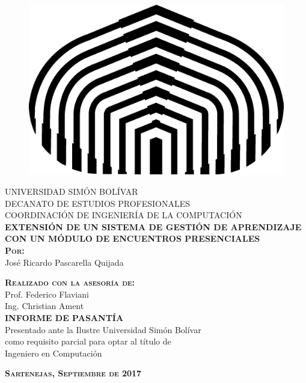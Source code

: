 \thispagestyle{empty} %
\begin{center}

\begin{figure}[h]
	\begin{center}
		\includegraphics{logos/logoUSB.png}
	\end{center}
\end{figure}

\textsc{UNIVERSIDAD SIMÓN BOLÍVAR}\\
\textsc{DECANATO DE ESTUDIOS PROFESIONALES}\\
\textsc{COORDINACIÓN DE INGENIERÍA DE LA COMPUTACIÓN}\\[8em]

\textsc{\Large \textbf{EXTENSIÓN DE UN SISTEMA DE GESTIÓN DE APRENDIZAJE CON UN MÓDULO DE ENCUENTROS PRESENCIALES}}\\[4em]

\textsc{ \textbf{Por:} }\\
José Ricardo Pascarella Quijada

\textsc{ \textbf{Realizado con la asesoría de:} }\\
Prof. Federico Flaviani \\
Ing. Christian Ament\\[4em]

\textsc{ \textbf{INFORME DE PASANTÍA} }\\
Presentado ante la Ilustre Universidad Simón Bolívar\\
como requisito parcial para optar al título de \\
Ingeniero en Computación

\vspace*{\fill}

\textsc{ \textbf{Sartenejas, Septiembre de 2017} }
\end{center}
